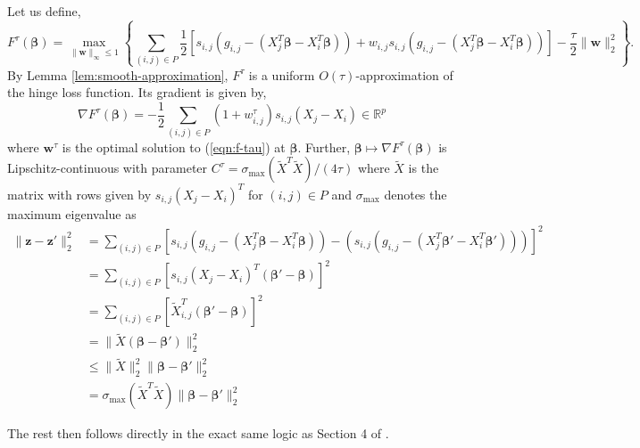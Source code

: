 \documentclass[a4paper, 11pt]{article}
\newcommand{\R}{\ensuremath{\mathbb{R}}}
\newcommand{\weights}{\ensuremath{\bm{\beta}}}
\begin{document}
Let us define,
\begin{equation}
    F^\tau(\weights) = \max_{\lVert \bm{w} \rVert_\infty \le 1} \left\{ \sum_{(i, j) \in P} \frac12 [s_{i,j}(g_{i,j} - (X_j^T \weights - X_i^T \weights)) + w_{i,j}s_{i,j}(g_{i,j} - (X_j^T \weights - X_i^T \weights)) ] - \frac{\tau}{2} \lVert \bm{w} \rVert_2^2 \right\}. \label{eqn:f-tau}
\end{equation}
By Lemma \ref{lem:smooth-approximation}, $F^\tau$ is a uniform
$O(\tau)$-approximation of the hinge loss function. Its gradient is given by,
\begin{equation}
    \nabla F^\tau(\weights) = -\frac12 \sum_{(i, j) \in P} (1 + w_{i,j}^\tau) s_{i,j} (X_j - X_i) \in \R^p \label{eqn:f-tau-derivative}
\end{equation}
where $\bm{w}^\tau$ is the optimal solution to (\ref{eqn:f-tau}) at $\weights$.
Further, $\weights \mapsto \nabla F^\tau(\weights)$ is Lipschitz-continuous with
parameter $C^\tau = \sigma_{\text{max}}(\tilde{X}^T \tilde{X}) / (4 \tau)$ where
$\tilde{X}$ is the matrix with rows given by $s_{i, j} (X_{j} - X_{i})^T$ for $(i,
    j) \in P$ and $\sigma_{\text{max}}$ denotes the maximum eigenvalue as
\begin{align*}
    \lVert \bm{z} - \bm{z'} \rVert_2^2 & =\sum_{(i, j) \in P} [s_{i, j} (g_{i, j} - (X_j^T \weights - X_i^T \weights)) - (s_{i, j} (g_{i, j} - (X_j^T \weights' - X_i^T \weights')))]^2 \\
                                       & =\sum_{(i, j) \in P} [s_{i, j} (X_j - X_i)^T(\weights' - \weights)]^2                                                                          \\
                                       & =\sum_{(i, j) \in P} [\tilde{X}_{i,j}^T(\weights' - \weights)]^2                                                                               \\
                                       & =\lVert \tilde{X} (\weights - \weights') \rVert_2^2                                                                                            \\
                                       & \le \lVert \tilde{X} \rVert_2^2 \lVert \weights - \weights' \rVert_2^2                                                                         \\
                                       & = \sigma_{\text{max}} (\tilde{X}^T \tilde{X}) \lVert \weights - \weights' \rVert_2^2
\end{align*}

The rest then follows directly in the exact same logic as Section 4 of \citet{Dedieu2022}.


\end{document}

